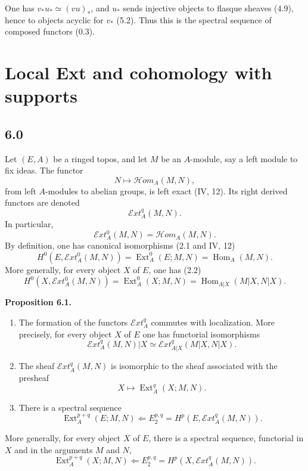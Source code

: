 \documentclass[11pt]{article}
\newcommand{\Hom}{\operatorname{Hom}}
\newcommand{\Ext}{\operatorname{Ext}}
\newcommand{\Hhom}{\mathcal{H}om}
\newcommand{\Eext}{\mathcal{E}xt}
\newenvironment{statement}[1]{\par\medskip\noindent\textbf{#1.}\ }{\par\medskip}
\begin{document}
One has $v_*u_*\simeq (vu)_*$, and $u_*$ sends injective objects to flasque sheaves (4.9), hence to objects acyclic for $v_*$ (5.2). Thus this is the spectral sequence of composed functors (0.3).

\section{Local Ext and cohomology with supports}

\subsection*{6.0}
Let $(E,A)$ be a ringed topos, and let $M$ be an $A$-module, say a left module to fix ideas. The functor
\[
        N\longmapsto \Hhom_A(M,N),
\]
from left $A$-modules to abelian groups, is left exact (IV, 12). Its right derived functors are denoted
\begin{equation*}
        \Eext_A^q(M,N).\tag{6.0.1}
\end{equation*}
In particular,
\begin{equation*}
        \Eext_A^0(M,N)=\Hhom_A(M,N).\tag{6.0.2}
\end{equation*}
By definition, one has canonical isomorphisms (2.1 and IV, 12)
\begin{equation*}
        H^0(E,\Eext_A^0(M,N))=\Ext_A^0(E;M,N)=\Hom_A(M,N).\tag{6.0.3}
\end{equation*}
More generally, for every object $X$ of $E$, one has (2.2)
\begin{equation*}
        H^0(X,\Eext_A^0(M,N))=\Ext_A^0(X;M,N)=\Hom_{A|X}(M|X,N|X).\tag{6.0.4}
\end{equation*}

\begin{statement}{Proposition 6.1}
\begin{enumerate}[label=\arabic*)]
\item The formation of the functors $\Eext_A^q$ commutes with localization. More precisely, for every object $X$ of $E$ one has functorial isomorphisms
\begin{equation*}
        \Eext_A^q(M,N)|X\simeq \Eext_{A|X}^q(M|X,N|X).\tag{6.1.1}
\end{equation*}
\item The sheaf $\Eext_A^q(M,N)$ is isomorphic to the sheaf associated with the presheaf
\[
        X\longmapsto \Ext_A^q(X;M,N).
\]
\item There is a spectral sequence
\begin{equation*}
        \Ext_A^{p+q}(E;M,N)\Longleftarrow E_2^{p,q}=H^p(E,\Eext_A^q(M,N)).\tag{6.1.2}
\end{equation*}
\end{enumerate}
More generally, for every object $X$ of $E$, there is a spectral sequence, functorial in $X$ and in the arguments $M$ and $N$,
\begin{equation*}
        \Ext_A^{p+q}(X;M,N)\Longleftarrow E_2^{p,q}=H^p(X,\Eext_A^q(M,N)).\tag{6.1.3}
\end{equation*}
\end{statement}
\end{document}
